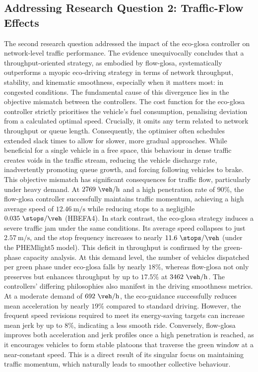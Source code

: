 \subsection*{Addressing Research Question 2: Traffic-Flow Effects}
The second research question addressed the impact of the \ac{eco-glosa} controller on network-level traffic performance. The evidence unequivocally concludes that a throughput-oriented strategy, as embodied by \ac{flow-glosa}, systematically outperforms a myopic eco-driving strategy in terms of network throughput, stability, and kinematic smoothness, especially when it matters most: in congested conditions.
\mynewline
The fundamental cause of this divergence lies in the objective mismatch between the controllers. The cost function for the \ac{eco-glosa} controller strictly prioritises the vehicle's fuel consumption, penalising deviation from a calculated optimal speed. Crucially, it omits any term related to network throughput or queue length. Consequently, the optimiser often schedules extended slack times to allow for slower, more gradual approaches. While beneficial for a single vehicle in a free space, this behaviour in dense traffic creates voids in the traffic stream, reducing the vehicle discharge rate, inadvertently promoting queue growth, and forcing following vehicles to brake.
\mynewline
This objective mismatch has significant consequences for traffic flow, particularly under heavy demand. At $2769~\unit{\veh\per\hour}$ and a high penetration rate of $90\%$, the \ac{flow-glosa} controller successfully maintains traffic momentum, achieving a high average speed of $12.46~\unit{\metre\per\second}$ while reducing stops to a negligible $0.035~\unit{\stops\per\veh}$ (HBEFA4). In stark contrast, the \ac{eco-glosa} strategy induces a severe traffic jam under the same conditions. Its average speed collapses to just $2.57~\unit{\metre\per\second}$, and the stop frequency increases to nearly $11.6~\unit{\stops\per\veh}$ (under the PHEMlight5 model). This deficit in throughput is confirmed by the green-phase capacity analysis. At this demand level, the number of vehicles dispatched per green phase under \ac{eco-glosa} falls by nearly $18\%$, whereas \ac{flow-glosa} not only preserves but enhances throughput by up to $17.5\%$ at $3462~\unit{\veh\per\hour}$.
\mynewline
The controllers' differing philosophies also manifest in the driving smoothness metrics. At a moderate demand of $692~\unit{\veh\per\hour}$, the eco-guidance successfully reduces mean acceleration by nearly $19\%$ compared to standard driving. However, the frequent speed revisions required to meet its energy-saving targets can increase mean jerk by up to $8\%$, indicating a less smooth ride. Conversely, \ac{flow-glosa} improves both acceleration and jerk profiles once a high penetration is reached, as it encourages vehicles to form stable platoons that traverse the green window at a near-constant speed. This is a direct result of its singular focus on maintaining traffic momentum, which naturally leads to smoother collective behaviour.

